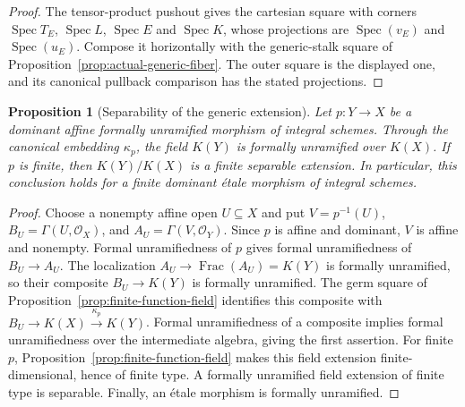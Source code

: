 \documentclass[11pt]{article}
\newtheorem{proposition}[theorem]{Proposition}
\theoremstyle{definition}
\theoremstyle{remark}
\DeclareMathOperator{\Spec}{Spec}
\DeclareMathOperator{\Frac}{Frac}
\begin{document}
\begin{proof}
The tensor-product pushout gives the cartesian square with corners
\(\Spec T_E\), \(\Spec L\), \(\Spec E\) and \(\Spec K\), whose projections are
\(\Spec(v_E)\) and \(\Spec(u_E)\). Compose it horizontally with
the generic-stalk square of Proposition~\ref{prop:actual-generic-fiber}.
The outer square is the displayed one, and its canonical pullback
comparison has the stated projections.
\end{proof}

\begin{proposition}[Separability of the generic extension]
\label{prop:separable-function-field}
Let \(p:Y\to X\) be a dominant affine formally unramified morphism
of integral schemes. Through the canonical embedding \(\kappa_p\),
the field \(K(Y)\) is formally unramified over \(K(X)\).
If \(p\) is finite, then \(K(Y)/K(X)\) is a finite separable
extension. In particular, this conclusion holds for a finite
dominant \'{e}tale morphism of integral schemes.
\end{proposition}

\begin{proof}
Choose a nonempty affine open \(U\subseteq X\) and put
\(V=p^{-1}(U)\), \(B_U=\Gamma(U,\mathcal O_X)\), and
\(A_U=\Gamma(V,\mathcal O_Y)\). Since \(p\) is affine and
dominant, \(V\) is affine and nonempty. Formal unramifiedness of
\(p\) gives formal unramifiedness of \(B_U\to A_U\).
The localization \(A_U\to\Frac(A_U)=K(Y)\) is formally
unramified, so their composite \(B_U\to K(Y)\) is formally
unramified. The germ square of
Proposition~\ref{prop:finite-function-field} identifies this
composite with \(B_U\to K(X)\xrightarrow{\kappa_p}K(Y)\).
Formal unramifiedness of a composite implies formal unramifiedness
over the intermediate algebra, giving the first assertion.
For finite \(p\), Proposition~\ref{prop:finite-function-field}
makes this field extension finite-dimensional, hence of finite
type. A formally unramified field extension of finite type is
separable. Finally, an \'{e}tale morphism is formally unramified.
\end{proof}
\end{document}
